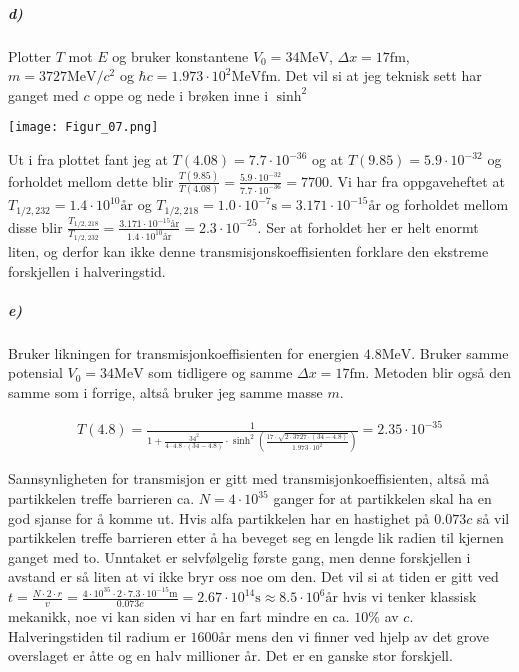 \documentclass[11pt, A4paper,norsk]{article}
\begin{document}
			\subparagraph{d)}
				\begin{flushleft}
Plotter $T$ mot $E$ og bruker konstantene $V_0 = 34 \text{MeV}$, $\Delta x = 17 \text{fm}$, $m = 3727 \text{MeV} / c^2$ og $\hbar c = 1.973 \cdot 10^{2} \text{MeVfm}$. Det vil si at jeg teknisk sett har ganget med $c$ oppe og nede i brøken inne i $\sinh^2$
				\end{flushleft}
\texttt{[image: Figur\_07.png]}
				\begin{flushleft}
Ut i fra plottet fant jeg at $T(4.08) = 7.7 \cdot 10^{-36}$ og at $T(9.85) = 5.9 \cdot 10^{-32}$ og forholdet mellom dette blir $\frac{T(9.85)}{T(4.08)} = \frac{5.9 \cdot 10^{-32}}{7.7 \cdot 10^{-36}} = 7700$. Vi har fra oppgaveheftet at $T_{1/2, 232} = 1.4 \cdot 10^{10} \text{år}$ og $T_{1/2, 218} = 1.0 \cdot 10^{-7} \text{s} = 3.171 \cdot 10^{-15} \text{år}$ og forholdet mellom disse blir $\frac{T_{1/2, 218}}{T_{1/2, 232}} = \frac{3.171 \cdot 10^{-15} \text{år}}{1.4 \cdot 10^{10} \text{år}} = 2.3 \cdot 10^{-25}$. Ser at forholdet her er helt enormt liten, og derfor kan ikke denne transmisjonskoeffisienten forklare den ekstreme forskjellen i halveringstid.
				\end{flushleft}








			\subparagraph{e)}
				\begin{flushleft}
Bruker likningen for transmisjonkoeffisienten for energien $4.8 \text{MeV}$. Bruker samme potensial $V_0 = 34 \text{MeV}$ som tidligere og samme $\Delta x = 17 \text{fm}$. Metoden blir også den samme som i forrige, altså bruker jeg samme masse $m$.
				\end{flushleft}
				\begin{gather*}
T(4.8) = \frac{1}{1 + \frac{34^2}{4 \cdot 4.8 \cdot ( 34 - 4.8 )} \cdot \sinh^2\left( \frac{17 \cdot \sqrt{2 \cdot 3727 \cdot ( 34 - 4.8 )}}{1.973 \cdot 10^{2}} \right)} = 2.35 \cdot 10^{-35}
				\end{gather*}
				\begin{flushleft}
Sannsynligheten for transmisjon er gitt med transmisjonkoeffisienten, altså må partikkelen treffe barrieren ca. $N = 4 \cdot 10^{35}$ ganger for at partikkelen skal ha en god sjanse for å komme ut. Hvis alfa partikkelen har en hastighet på $0.073 c$ så vil partikkelen treffe barrieren etter å ha beveget seg en lengde lik radien til kjernen ganget med to. Unntaket er selvfølgelig første gang, men denne forskjellen i avstand er så liten at vi ikke bryr oss noe om den. Det vil si at tiden er gitt ved $t = \frac{N \cdot 2 \cdot r}{v} = \frac{4 \cdot 10^{35} \cdot 2 \cdot 7.3 \cdot 10^{-15} \text{m}}{0.073 c} = 2.67 \cdot 10^{14} \text{s} \approx 8.5 \cdot 10^{6} \text{år}$ hvis vi tenker klassisk mekanikk, noe vi kan siden vi har en fart mindre en ca. $10 \%$ av $c$. Halveringstiden til radium er $1600 \text{år}$ mens den vi finner ved hjelp av det grove overslaget er åtte og en halv millioner år. Det er en ganske stor forskjell.
				\end{flushleft}
\end{document}
